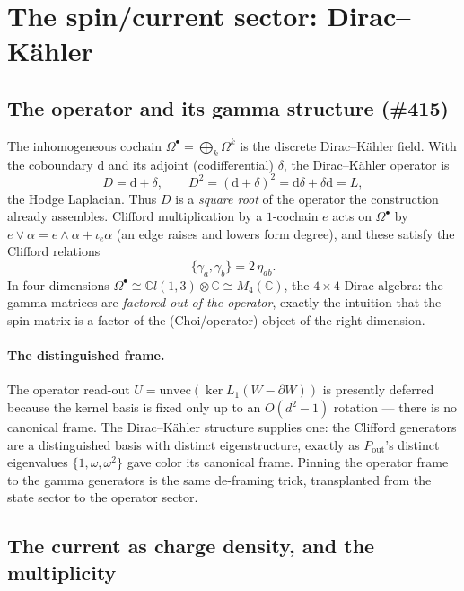 \documentclass[11pt]{article}
\theoremstyle{definition}
\newcommand{\C}{\mathbb{C}}
\newcommand{\Pout}{P_{\mathrm{out}}}
\newcommand{\dd}{\mathrm{d}}
\begin{document}
\section{The spin/current sector: Dirac--K\"ahler}
\label{sec:dk}

\subsection{The operator and its gamma structure (\#415)}

The inhomogeneous cochain $\Omega^\bullet=\bigoplus_{k}\Omega^k$ is the discrete
Dirac--K\"ahler field. With the coboundary $\dd$ and its adjoint (codifferential)
$\delta$, the Dirac--K\"ahler operator is
\begin{equation}
  D = \dd+\delta, \qquad D^2=(\dd+\delta)^2=\dd\delta+\delta\dd = L,
  \label{eq:dk}
\end{equation}
the Hodge Laplacian. Thus $D$ is a \emph{square root} of the operator the construction
already assembles. Clifford multiplication by a $1$-cochain $e$ acts on $\Omega^\bullet$
by $e\vee\alpha = e\wedge\alpha + \iota_e\alpha$ (an edge raises and lowers form degree),
and these satisfy the Clifford relations
\begin{equation}
  \{\gamma_a,\gamma_b\}=2\,\eta_{ab}.
\end{equation}
In four dimensions $\Omega^\bullet\cong\C l(1,3)\otimes\C\cong M_4(\C)$, the $4\times4$
Dirac algebra: the gamma matrices are \emph{factored out of the operator}, exactly the
intuition that the spin matrix is a factor of the (Choi/operator) object of the right
dimension.

\paragraph{The distinguished frame.} The operator read-out
$U=\mathrm{unvec}(\ker L_1(W-\partial W))$ is presently deferred because the kernel basis
is fixed only up to an $O(d^2-1)$ rotation --- there is no canonical frame. The
Dirac--K\"ahler structure supplies one: the Clifford generators are a distinguished basis
with distinct eigenstructure, exactly as $\Pout$'s distinct eigenvalues
$\{1,\omega,\omega^2\}$ gave color its canonical frame. Pinning the operator frame to the
gamma generators is the same de-framing trick, transplanted from the state sector to the
operator sector.

\subsection{The current as charge density, and the multiplicity}
\end{document}
